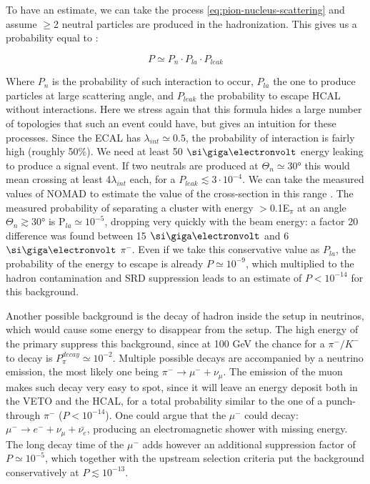 To have an estimate, we can take the process \ref{eq:pion-nucleus-scattering} and assume $\geq$2 neutral particles are produced in the hadronization. This gives us a probability equal to \cite{gkkk1}:

\begin{equation}
  \label{eq:transverse-leak-estimate}
  P \simeq P_n \cdot P_{la} \cdot P_{leak}
\end{equation}

Where $P_n$ is the probability of such interaction to occur, $P_{la}$ the one to produce particles at large scattering angle, and $P_{leak}$ the probability to escape HCAL without interactions. Here we stress again that this formula hides a large number of topologies that such an event could have, but gives an intuition for these processes. Since the ECAL has $\lambda_{int} \simeq 0.5$, the probability of interaction is fairly high (roughly 50\%). We need at least 50 $\gev$ energy leaking to produce a signal event. If two neutrals are produced at $\Theta_{n} \simeq 30$\si{\degree} this would mean crossing at least 4$\lambda_{int}$ each, for a $P_{leak} \lesssim 3 \cdot 10^{-4}$. We can take the measured values of NOMAD to estimate the value of the cross-section in this range \cite{AUTIERO1998285,GNINENKO1998583}. The measured probability of separating a cluster with energy $>$0.1E$_{\pi}$ at an angle $\Theta_{n} \gtrsim 30$\si{\degree} is P$_{la} \simeq 10^{-5}$, dropping very quickly with the beam energy: a factor 20 difference was found between 15 $\gev$ and 6 $\gev$ $\pi^-$. Even if we take this conservative value as $P_{la}$, the probability of the energy to escape is already $P\simeq 10^{-9}$, which multiplied to the hadron contamination and SRD suppression leads to an estimate of $P<10^{-14}$ for this background.

Another possible background is the decay of hadron inside the setup in neutrinos, which would cause some energy to disappear from the setup. The high energy of the primary suppress this background, since at 100 GeV the chance for a $\pi^-/K^-$ to decay is $P^{decay}_{\pi} \simeq  10^{-2}$. Multiple possible decays are accompanied by a neutrino emission, the most likely one being $\pi^- \rightarrow \mu^- +\nu_{\mu}$. The emission of the muon makes such decay very easy to spot, since it will leave an energy deposit both in the VETO and the HCAL, for a total probability similar to the one of a punch-through $\pi^-$ ($P < 10^{-14}$). One could argue that the $\mu^-$ could decay: $\mu^- \rightarrow e^- + \nu_{\mu}+ \bar{\nu_{e}}$, producing an electromagnetic shower with missing energy. The long decay time of the $\mu^-$ adds however an additional suppression factor of $P\simeq 10^{-5}$, which together with the upstream selection criteria put the background conservatively at $P \lesssim 10^{-13}$.

